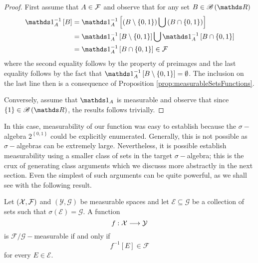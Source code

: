 \begin{proof}
First assume that $A\in\mathcal{F}$ and observe that for any set $B\in\borel\left(\R\right)$
\begin{align*}
\indicate_{A}^{-1}\left[B\right] & =\indicate_{A}^{-1}\left[\left(B\setminus\left\{ 0,1\right\} \right)\bigcup\left(B\cap\left\{ 0,1\right\} \right)\right]\\
 & =\indicate_{A}^{-1}\left[B\setminus\left\{ 0,1\right\} \right]\bigcup\indicate_{A}^{-1}\left[B\cap\left\{ 0,1\right\} \right]\\
 & =\indicate_{A}^{-1}\left[B\cap\left\{ 0,1\right\} \right]\in\F
\end{align*}
where the second equality follows by the property of preimages and
the last equality follows by the fact that $\indicate_{A}^{-1}\left[B\setminus\left\{ 0,1\right\} \right]=\emptyset$.
The inclusion on the last line then is a consequence of Proposition
\ref{prop:measurableSetsFunctions}.

Conversely, assume that $\indicate_{A}$ is measurable and observe
that since $\left\{ 1\right\} \in\borel\left(\R\right)$, the results
follows trivially.
\end{proof}
In this case, measurability of our function was easy to establish
because the $\sigma-$algebra $2^{\left\{ 0,1\right\} }$ could be
explicitly enumerated. Generally, this is not possible as $\sigma-$algebras
can be extremely large. Nevertheless, it is possible establish measurability
using a smaller class of sets in the target $\sigma-$algebra; this
is the crux of generating class arguments which we discusss more abstractly
in the next section. Even the simplest of such arguments can be quite
powerful, as we shall see with the following result.
\begin{thm}
\label{thm:genericGeneratingClassArgument}Let $\left(\mathcal{X},\mathcal{F}\right)$
and $\left(\mathcal{Y},\mathcal{G}\right)$ be measurable spaces and
let $\mathcal{E}\subseteq\mathcal{G}$ be a collection of sets such
that $\sigma\left(\mathcal{E}\right)=\mathcal{G}.$ A function
\[
f:\mathcal{X}\longrightarrow\mathcal{Y}
\]
is $\mathcal{F}/\mathcal{G}-$measurable if and only if 
\[
f^{-1}\left[E\right]\in\mathcal{F}
\]
for every $E\in\mathcal{E}.$
\end{thm}

